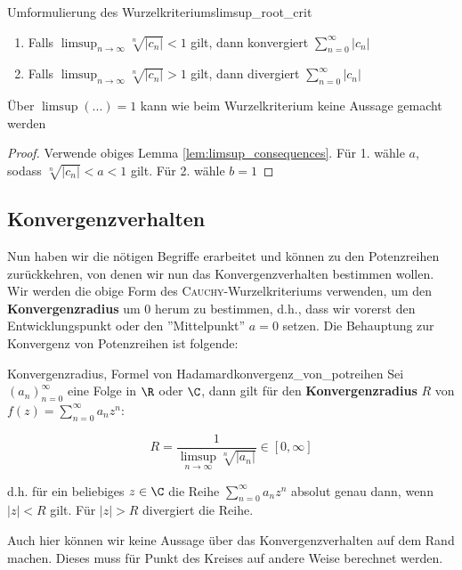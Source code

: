 \begin{satz}{Umformulierung des Wurzelkriteriums}{limsup_root_crit}
\begin{enumerate}
    \item Falls $\limsup_{n \to \infty} \sqrt[n]{|c_n|} < 1$ gilt, dann konvergiert $\sum_{n=0}^{\infty}|c_n|$
    \item Falls $\limsup_{n \to \infty} \sqrt[n]{|c_n|} > 1$ gilt, dann divergiert $\sum_{n=0}^{\infty}|c_n|$
\end{enumerate}
\end{satz}

\begin{remark}
Über $\limsup (...) = 1$ kann wie beim Wurzelkriterium keine Aussage gemacht werden
\end{remark}

\begin{proof}
Verwende obiges Lemma \ref{lem:limsup_consequences}. Für 1. wähle $a$, sodass $\sqrt[n]{|c_n|} < a < 1$ gilt. Für 2. wähle $b = 1$
\end{proof}

\subsection{Konvergenzverhalten}
Nun haben wir die nötigen Begriffe erarbeitet und können zu den Potenzreihen zurückkehren, von denen wir nun das Konvergenzverhalten bestimmen wollen. Wir werden die obige Form des \textsc{Cauchy}-Wurzelkriteriums verwenden, um den \textbf{Konvergenzradius} um $0$ herum zu bestimmen, d.h., dass wir vorerst den Entwicklungspunkt oder den ''Mittelpunkt'' $a = 0$ setzen. Die Behauptung zur Konvergenz von Potenzreihen ist folgende:

\begin{satz}{Konvergenzradius, Formel von Hadamard}{konvergenz_von_potreihen}
Sei $(a_n)_{n=0}^\infty$ eine Folge in $\R$ oder $\C$, dann gilt für den \textbf{Konvergenzradius} $R$ von $f(z) = \sum_{n=0}^\infty a_n z^n$:

$$R = \frac{1}{\limsup_{n \to \infty}\sqrt[n]{|a_n|}} \in [0, \infty]$$

d.h. für ein beliebiges $z \in \C$ die Reihe $\sum_{n=0}^\infty a_n z^n$ absolut genau dann, wenn $|z|< R$ gilt. Für $|z|>R$ divergiert die Reihe.
\end{satz}

\begin{remark} Auch hier können wir keine Aussage über das Konvergenzverhalten auf dem Rand machen. Dieses muss für Punkt des Kreises auf andere Weise berechnet werden.
\end{remark}

